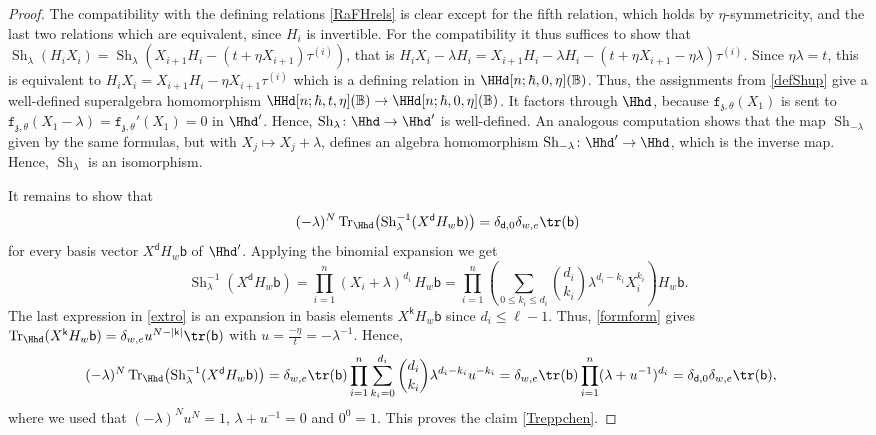 \documentclass[a4paper,11pt]{amsart}
\newcommand{\Tr}{\op{Tr}}
\numberwithin{equation}{subsection}
\theoremstyle{definition}
\theoremstyle{theorem}
\theoremstyle{remark}
\newcommand\charge{{\mathfrak{z}}}
\newcommand\fct{\mathtt{f}_{\charge,\theta}}
\newcommand\Sh[1][\lambda]{\op{Sh}_{#1}}
\newcommand\bd{\mathsf{d}}
\newcommand\bb{\mathsf{b}}
\newcommand\op{\operatorname}
\newcommand\taui[1][i]{\tau^{(#1)}}
\newcommand{\Bo}{\mathbb{B}}
\begin{document}
\begin{proof}
The compatibility with the defining relations \autoref{RaFHrels} is clear except for the fifth relation,  which holds by $\eta$-symmetricity, and
the last two relations which are equivalent, since $H_i$ is invertible. For the compatibility  it thus suffices to show that $\Sh(H_iX_i)=\Sh(X_{i+1}H_i-(t+\eta X_{i+1})\taui)$, that is  $H_iX_i-\lambda H_i=X_{i+1}H_i-\lambda H_i
-(t+\eta X_{i+1}-\eta\lambda)\taui$. Since $\eta\lambda=t$, this is equivalent to $H_iX_i=X_{i+1}H_i
-\eta X_{i+1}\taui$  which is a defining relation in $\HHd[n;\hbar,0,\eta](\Bo)$. Thus, the assignments from \autoref{defShup} give a well-defined superalgebra homomorphism
${\HHd[n;\hbar,t,\eta](\Bo)}\rightarrow\HHd[n;\hbar,0,\eta](\Bo)$. It
factors through $\Hhd$, because $\fct(X_1)$  is sent
to~$\fct(X_1-\lambda)=\fct'(X_1)=0$ in ${\Hhd}'$. Hence,
$\Sh\colon\Hhd\to{\Hhd}'$ is well-defined.  An analogous computation
shows that the map $\Sh[-\lambda]$ given by the same formulas, but with
$X_j\mapsto X_j+\lambda$, defines an algebra homomorphism
$\Sh[-\lambda]\colon{\Hhd}'\to\Hhd$, which is the inverse map. Hence,
$\Sh$ is an isomorphism.

It remains to show that
\begin{equation}\label{Treppchen}
(-\lambda)^{N}\Tr_{\Hhd}\bigl(\Sh^{-1}(X^{\bd}H_w\bb)\bigr)=\delta_{\bd,0}\delta_{w,e}\tr(\bb)
\end{equation}
for every basis vector $X^{\bd}H_w\bb$ of ${\Hhd}'$. Applying the binomial expansion we get
\begin{equation}\label{extro}
\Sh^{-1}(X^{\bd}H_w\bb)=\prod_{i=1}^{n}(X_i+\lambda)^{d_i}\,H_w\bb=\prod_{i=1}^{n}\left(\sum_{0\leq k_i\leq d_i}\binom{d_i}{k_i}\lambda^{d_i-k_i}X_i^{k_i}\right)H_w\bb.
\end{equation}
The last expression in  \autoref{extro} is an expansion in basis elements $X^{\mathsf k}H_w\bb$ since $d_i\leq\ell-1$. Thus,  \autoref{formform} gives $\Tr_{\Hhd}(X^{\mathsf k}H_w\bb)=\delta_{w,e}u^{N-|\mathsf k|}\tr(\bb)$ with $u=\frac{-\eta}{t}=-\lambda^{-1}$. Hence,
\begin{align*}
(-\lambda)^{N}\Tr_{\Hhd}\bigl(\Sh^{-1}(X^{\bd}H_w\bb)\bigr)&=\delta_{w,e}\tr(\bb)\prod_{i=1}^{n} \sum_{k_i=0}^{d_i}\binom{d_i}{k_i}\lambda^{d_i-k_i}u^{-k_i}=\delta_{w,e}\tr(\bb)\prod_{i=1}^{n}(\lambda+u^{-1})^{d_i}=\delta_{\bd,0}\delta_{w,e}\tr(\bb),
\end{align*}
where we used that $(-\lambda)^{N}u^{N}=1$, $\lambda+u^{-1}=0$ and $0^{0}=1$. This proves the claim \autoref{Treppchen}.
\end{proof}
\end{document}
